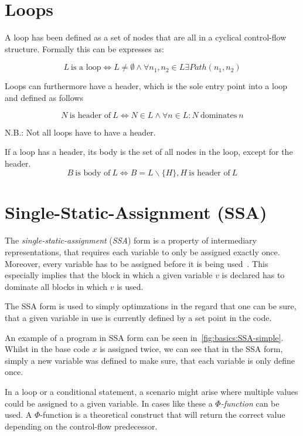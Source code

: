 
\section{Loops}\label{sec:basics:loops}

A loop has been defined as a set of nodes that are all in a cyclical control-flow structure.
Formally this can be expresses as:

$$L~\text{is a loop} \Longleftrightarrow L \neq \emptyset \wedge \forall n_1, n_2 \in L \exists Path(n_1, n_2)$$

Loops can furthermore have a header, which is the sole entry point into a loop~\cite{aebi18bachelorarbeit} and defined as follows

$$N~\text{is header of}~L \Longleftrightarrow N \in L \wedge \forall n \in L: N~\text{dominates}~n$$

N.B.: Not all loops have to have a header.

If a loop has a header, its body is the set of all nodes in the loop, except for the header.
$$B~\text{is body of}~L \Longleftrightarrow B = L \backslash \{H\}, H~\text{is header of}~L$$

\section{Single-Static-Assignment (SSA)}\label{sec:basics:ssa}

The \textit{single-static-assignment} (\textit{SSA}) form is a property of intermediary representations, that requires each variable to only be assigned exactly once.
Moreover, every variable has to be assigned before it is being used~\cite{cytron91}.
This especially implies that the block in which a given variable $v$ is declared has to dominate all blocks in which $v$ is used.

The SSA form is used to simply optimzations in the regard that one can be sure, that a given variable in use is currently defined by a set point in the code.

An example of a program in SSA form can be seen in~\cref{fig:basics:SSA-simple}.
Whilst in the base code $x$ is assigned twice, we can see that in the SSA form, simply a new variable was defined to make sure, that each variable is only define once.



In a loop or a conditional statement, a scenario might arise where multiple values could be assigned to a given variable.
In cases like these a \textit{$\Phi$-function} can be used.
A $\Phi$-function is a theoretical construct that will return the correct value depending on the control-flow predecessor.

